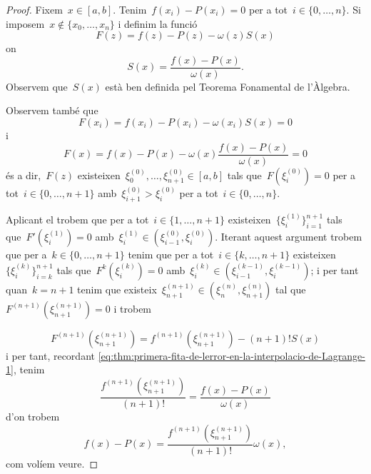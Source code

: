 \documentclass[../metodes-numerics.tex]{subfiles}
\begin{document}
    \begin{proof}
        Fixem~\(x\in[a,b]\).
        Tenim~\(f(x_{i})-P(x_{i})=0\) per a tot~\(i\in\{0,\dots,n\}\).
        Si imposem~\(x\notin\{x_{0},\dots,x_{n}\}\) i definim la funció
        \[
            F(z)=f(z)-P(z)-\omega(z)S(x)
        \]
        on
        \begin{equation}\label{eq:thm:primera-fita-de-lerror-en-la-interpolacio-de-Lagrange-1}
        S(x)=\frac{f(x)-P(x)}{\omega(x)}.
        \end{equation}
        Observem que~\(S(x)\) està ben definida pel Teorema Fonamental de l'Àlgebra.

        Observem també que
        \[
            F(x_{i})=f(x_{i})-P(x_{i})-\omega(x_{i})S(x)=0
        \]
        i
        \[
            F(x)=f(x)-P(x)-\omega(x)\frac{f(x)-P(x)}{\omega(x)}=0
        \]
        és a dir,~\(F(z)\) existeixen~\(\xi^{(0)}_{0},\dots,\xi^{(0)}_{n+1}\in[a,b]\) tals que~\(F(\xi^{(0)}_{i})=0\) per a tot~\(i\in\{0,\dots,n+1\}\) amb~\(\xi^{(0)}_{i+1}>\xi^{(0)}_{i}\) per a tot~\(i\in\{0,\dots,n\}\).

        Aplicant el  trobem que per a tot~\(i\in\{1,\dots,n+1\}\) existeixen~\(\{\xi^{(1)}_{i}\}_{i=1}^{n+1}\) tals que~\(F'(\xi^{(1)}_{i})=0\) amb~\(\xi^{(1)}_{i}\in(\xi^{(0)}_{i-1},\xi^{(0)}_{i})\).
        Iterant aquest argument trobem que per a~\(k\in\{0,\dots,n+1\}\) tenim que per a tot~\(i\in\{k,\dots,n+1\}\) existeixen~\(\{\xi^{(k)}_{i}\}_{i=k}^{n+1}\) tals que~\(F^{k}(\xi^{(k)}_{i})=0\) amb~\(\xi^{(k)}_{i}\in(\xi^{(k-1)}_{i-1},\xi^{(k-1)}_{i})\); i per tant quan~\(k=n+1\) tenim que existeix~\(\xi^{(n+1)}_{n+1}\in(\xi^{(n)}_{n},\xi^{(n)}_{n+1})\) tal que~\(F^{(n+1)}(\xi^{(n+1)}_{n+1})=0\) i trobem%
            \begin{comment}
                \marginpar{Dime si es verdad\\
                Que alguien ha logrado escapar de esta tela de araña.\\
                Dime cuanto cuesta\hfil\twonotes\hfil\\
                Saber la puta verdad\\
                Y quien le pone precio.}
            \end{comment}
        \[
            F^{(n+1)}(\xi^{(n+1)}_{n+1})=f^{(n+1)}(\xi^{(n+1)}_{n+1})-(n+1)!S(x)
        \]%
        i per tant, recordant \eqref{eq:thm:primera-fita-de-lerror-en-la-interpolacio-de-Lagrange-1}, tenim
        \[
            \frac{f^{(n+1)}(\xi^{(n+1)}_{n+1})}{(n+1)!}=\frac{f(x)-P(x)}{\omega(x)}
        \]
        d'on trobem
        \[
            f(x)-P(x)=\frac{f^{(n+1)}(\xi^{(n+1)}_{n+1})}{(n+1)!}\omega(x),
        \]
        com volíem veure.
    \end{proof}
\end{document}
